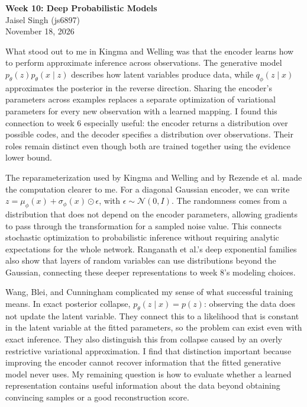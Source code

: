 \documentclass[12pt]{article}
\begin{document}
\begin{flushleft}
\textbf{Week 10: Deep Probabilistic Models} \\
Jaisel Singh (js6897) \\
November 18, 2026
\end{flushleft}

\vspace{0.1in}

What stood out to me in Kingma and Welling was that the encoder learns how to
perform approximate inference across observations. The generative model
$p_\theta(z)p_\theta(x\mid z)$ describes how latent variables produce data,
while $q_\phi(z\mid x)$ approximates the posterior in the reverse direction.
Sharing the encoder's parameters across examples replaces a separate
optimization of variational parameters for every new observation with a learned
mapping. I found this connection to week 6 especially useful: the encoder
returns a distribution over possible codes, and the decoder specifies a
distribution over observations. Their roles remain distinct even though both
are trained together using the evidence lower bound.

The reparameterization used by Kingma and Welling and by Rezende et al. made the
computation clearer to me. For a diagonal Gaussian encoder, we can write
\mbox{$z=\mu_\phi(x)+\sigma_\phi(x)\odot\epsilon$}, with
\mbox{$\epsilon\sim\mathcal{N}(0,I)$}. The randomness comes from a distribution that
does not depend on the encoder parameters, allowing gradients to pass through
the transformation for a sampled noise value. This connects stochastic
optimization to probabilistic inference without requiring analytic expectations
for the whole network. Ranganath et al.'s deep exponential families also show
that layers of random variables can use distributions beyond the Gaussian,
connecting these deeper representations to week 8's modeling choices.

Wang, Blei, and Cunningham complicated my sense of what successful training
means. In exact posterior collapse, $p_\theta(z\mid x)=p(z)$: observing the data
does not update the latent variable. They connect this to a likelihood that is
constant in the latent variable at the fitted parameters, so the problem can
exist even with exact inference. They also distinguish this from collapse
caused by an overly restrictive variational approximation. I find that
distinction important because improving the encoder cannot recover information
that the fitted generative model never uses. My remaining question is how to
evaluate whether a learned representation contains useful information about
the data beyond obtaining convincing samples or a good reconstruction score.
\end{document}
